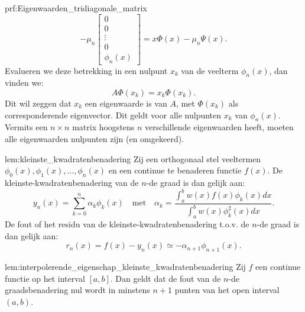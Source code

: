 \begin{prf}{prf:Eigenwaarden_tridiagonale_matrix}
\begin{equation*}
        - \mu_n\begin{bmatrix}
            0 \\
            0 \\
            \vdots \\
            0 \\
            \phi_{n}(x)
        \end{bmatrix}
        = x\Phi(x) - \mu_n\Psi(x).
    \end{equation*}
    Evalueren we deze betrekking in een nulpunt $x_k$ van de veelterm $\phi_n(x)$, dan vinden we:
    \begin{equation*}
        A\Phi(x_k) = x_k\Phi(x_k).
    \end{equation*}
    Dit wil zeggen dat $x_k$ een eigenwaarde is van $A$, met $\Phi(x_k)$ als corresponderende eigenvector. Dit geldt voor alle nulpunten $x_k$ van $\phi_n(x)$. Vermits een $n \times n $ matrix hoogstens $n$ verschillende eigenwaarden heeft, moeten alle eigenwaarden nulpunten zijn (en omgekeerd).
\end{prf}

\newpage

\begin{lem}{lem:kleinste_kwadratenbenadering}
    Zij een orthogonaal stel veeltermen $\phi_0(x), \phi_1(x), \ldots, \phi_n(x)$ en een continue te benaderen functie $f(x)$. De kleinste-kwadratenbenadering van de $n$-de graad is dan gelijk aan:
    \begin{equation*}
        y_n(x) = \sum_{k=0}^n \alpha_k\phi_k(x) \quad \text{met} \quad \alpha_k = \frac{\int_a^b w(x)f(x)\phi_k(x)dx}{\int_a^b w(x) \phi_k^2(x)dx}.
    \end{equation*}
    De fout of het residu van de kleinste-kwadratenbenadering t\@.o\@.v\@. de $n$-de graad is dan gelijk aan:
    \begin{equation*}
        r_n(x) = f(x) - y_n(x) \simeq -\alpha_{n+1}\phi_{n+1}(x).
    \end{equation*}
    \vspace{-0.5cm}
\end{lem}

\begin{lem}{lem:interpolerende_eigenschap_kleinste_kwadratenbenadering}
    Zij $f$ een continue functie op het interval $[a,b]$. Dan geldt dat de fout van de $n$-de graadsbenadering nul wordt in minstens $n+1$ punten van het open interval $(a,b)$.
\end{lem}

